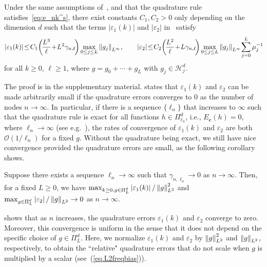 \documentclass{article} %
\begin{document}
\begin{thm}\label{thm.quaderr}
Under the same assumptions of~, and that the quadrature rule satisfies~\cref{eq:e_nk^s}, there exist constants $C_1, C_2 > 0$ only depending on the dimension $d$ such that the terms $|\varepsilon_1(k)|$ and $|\varepsilon_2|$ in~ satisfy
\begin{equation*}
    \abs{\varepsilon_1(k)} \!\leq\! C_1 \!\left(\!\frac{L^3}{\ell} \!+\! L^2 \gamma_{n,\ell}\!\right) \max_{0\leq j\leq L} \norm{g_j}_{L^\infty}\!, \qquad \abs{\varepsilon_2} \!\leq\! C_2 \!\left(\!\frac{L^2}{\ell} \!+\! L\gamma_{n,\ell}\!\right) \max_{0\leq j\leq L} \norm{g_j}_{L^\infty} \!\sum_{j=0}^L \mu_j^{-1}\! 
\end{equation*}
for all $k \geq 0$, $\ell \geq 1$, where $g = g_0 +\cdots+g_L$ with $g_j\in\mathcal{H}_j^d$.
\end{thm}

The proof is in the supplementary material.  states that $\varepsilon_1(k)$ and $\varepsilon_2$ can be made arbitrarily small if the quadrature errors converges to $0$ as the number of nodes $n\rightarrow\infty$. In particular, if there is a sequence $\{\ell_n\}$ that increases to $\infty$ such that the quadrature rule is exact for all functions $h \in \Pi_{\ell_n}^d$, i.e., $E_{\mathbf{c}}(h) = 0$, where $\ell_n \rightarrow \infty$ (see e.g.~\citep{mhaskar}), the rates of convergence of $\varepsilon_1(k)$ and $\varepsilon_2$ are both $\mathcal{O}(1/\ell_n)$ for a fixed $g$. Without the quadrature being exact, we still have nice convergence provided the quadrature errors are small, as the following corollary shows.
\begin{cor}\label{cor.quaderr}
Suppose there exists a sequence $\ell_n \rightarrow \infty$ such that $\gamma_{n,\ell_n} \rightarrow 0$ as $n \rightarrow \infty$. Then, for a fixed $L \geq 0$, we have $\max_{k \geq 0, g \in \Pi_L^d} \left|\varepsilon_1(k)\right| / \left\lVert g\right\rVert^2_{L^2}$ and $\max_{g \in \Pi_L^d} \left|\varepsilon_2\right| / \left\lVert g\right\rVert_{L^2} \rightarrow 0$ as $n \rightarrow \infty$.
\end{cor}

 shows that as $n$ increases, the quadrature errors $\varepsilon_1(k)$ and $\varepsilon_2$ converge to zero. Moreover, this convergence is uniform in the sense that it does not depend on the specific choice of $g \in \Pi_L^d$. Here, we normalize $\varepsilon_1(k)$ and $\varepsilon_2$ by $\left\lVert g\right\rVert_{L^2}^2$ and $\left\lVert g\right\rVert_{L^2}$, respectively, to obtain the ``relative" quadrature errors that do not scale when $g$ is multiplied by a scalar (see~(\ref{eq.L2freqbias})).
\end{document}
